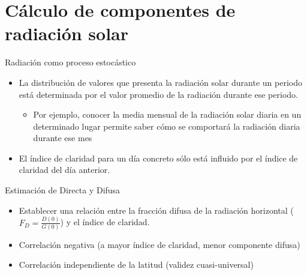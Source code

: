 \documentclass[xcolor={usenames,svgnames,dvipsnames}]{beamer}
\begin{document}
\section{Cálculo de componentes de radiación solar}
\label{sec:org1dfe290}

\begin{frame}[label={sec:org1a0d75e}]{Radiación como proceso estocástico}
\begin{itemize}
\item La \alert{distribución de valores} que presenta la radiación solar durante un periodo está \alert{determinada por el valor promedio de la radiación durante ese periodo}.

\begin{itemize}
\item Por ejemplo, conocer la media mensual de la radiación solar diaria en un determinado lugar permite saber cómo se comportará la radiación diaria durante ese mes
\end{itemize}

\item El índice de claridad para un día concreto \alert{sólo está influido} por el índice de claridad del \alert{día anterior}.
\end{itemize}
\end{frame}

\begin{frame}[label={sec:org892fdb3}]{Estimación de Directa y Difusa}
\begin{itemize}
\item Establecer una \alert{relación entre la fracción difusa} de la radiación horizontal (\(F_{D}=\frac{D(0)}{G(0)}\)) y \alert{el índice de claridad}.

\item \alert{Correlación negativa} (a mayor índice de claridad, menor componente difusa)

\item \alert{Correlación independiente de la latitud} (validez cuasi-universal)
\end{itemize}
\end{frame}
\end{document}
